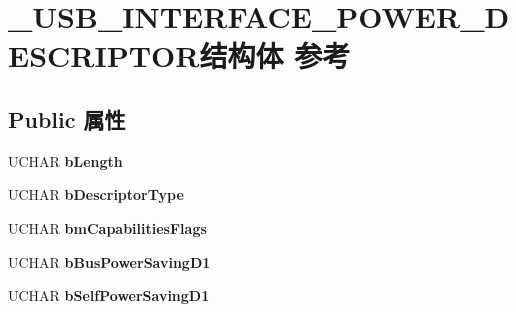 \hypertarget{struct___u_s_b___i_n_t_e_r_f_a_c_e___p_o_w_e_r___d_e_s_c_r_i_p_t_o_r}{}\section{\+\_\+\+U\+S\+B\+\_\+\+I\+N\+T\+E\+R\+F\+A\+C\+E\+\_\+\+P\+O\+W\+E\+R\+\_\+\+D\+E\+S\+C\+R\+I\+P\+T\+O\+R结构体 参考}
\label{struct___u_s_b___i_n_t_e_r_f_a_c_e___p_o_w_e_r___d_e_s_c_r_i_p_t_o_r}
\subsection*{Public 属性}
\begin{DoxyCompactItemize}
\item 
\mbox{\label{struct___u_s_b___i_n_t_e_r_f_a_c_e___p_o_w_e_r___d_e_s_c_r_i_p_t_o_r_aad07d0d13b6ea7277baec8c50de4fb13}} 
U\+C\+H\+AR {\bfseries b\+Length}
\item 
\mbox{\label{struct___u_s_b___i_n_t_e_r_f_a_c_e___p_o_w_e_r___d_e_s_c_r_i_p_t_o_r_af701a211ed8949efb37e055bee663eb4}} 
U\+C\+H\+AR {\bfseries b\+Descriptor\+Type}
\item 
\mbox{\label{struct___u_s_b___i_n_t_e_r_f_a_c_e___p_o_w_e_r___d_e_s_c_r_i_p_t_o_r_a3d42a2677e5bd51f67604ca732a5cad9}} 
U\+C\+H\+AR {\bfseries bm\+Capabilities\+Flags}
\item 
\mbox{\label{struct___u_s_b___i_n_t_e_r_f_a_c_e___p_o_w_e_r___d_e_s_c_r_i_p_t_o_r_aae14608a6cfff22318dcc9e5c700a775}} 
U\+C\+H\+AR {\bfseries b\+Bus\+Power\+Saving\+D1}
\item 
\mbox{\label{struct___u_s_b___i_n_t_e_r_f_a_c_e___p_o_w_e_r___d_e_s_c_r_i_p_t_o_r_acc94bd18062bc186f4e2d3d2c2b2e8a0}} 
U\+C\+H\+AR {\bfseries b\+Self\+Power\+Saving\+D1}
\item 

\end{DoxyCompactItemize}
